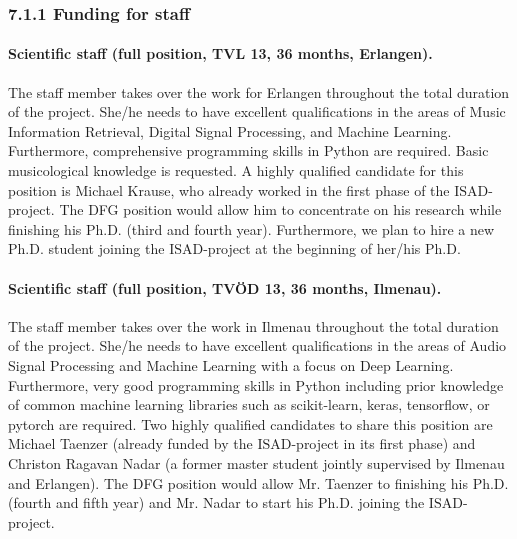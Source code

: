 \documentclass[11pt,a4paper]{article}
\def\PN{\mathrm{ISAD}}
\theoremstyle{plain} \newtheorem{define}{Definition}[section]
\begin{document}
{%
\subsubsection*{7.1.1 Funding for staff}

\paragraph*{Scientific staff (full position, TVL 13, 36 months, Erlangen).}
The staff member takes over the work for Erlangen throughout the total duration of the project. She/he needs to have excellent qualifications in the areas of Music Information Retrieval, Digital Signal Processing, and Machine Learning. Furthermore, comprehensive programming skills in Python are required. Basic musicological knowledge is requested.
%
A highly qualified candidate for this position is Michael Krause, who already worked in the first phase of the $\PN$-project. The DFG position would allow him to concentrate on his research while finishing his Ph.D. (third and fourth year). Furthermore, we plan to hire a new Ph.D. student joining the $\PN$-project at the beginning of her/his Ph.D.

\paragraph*{Scientific staff (full position, TV{\"O}D 13, 36 months, Ilmenau).}
The staff member takes over the work in Ilmenau throughout the total duration of the project. She/he needs to have excellent qualifications in the areas of Audio Signal Processing and Machine Learning with a focus on Deep Learning. Furthermore, very good programming skills in Python including prior knowledge of common machine learning libraries such as scikit-learn, keras, tensorflow, or pytorch are required.
%
Two highly qualified candidates to share this position are Michael Taenzer (already funded by the $\PN$-project in its first phase) and Christon Ragavan Nadar (a former master student jointly supervised by Ilmenau and Erlangen). The DFG position would allow Mr. Taenzer to finishing his Ph.D. (fourth and fifth year) and Mr. Nadar to start his Ph.D. joining the $\PN$-project.
%

}
\end{document}
